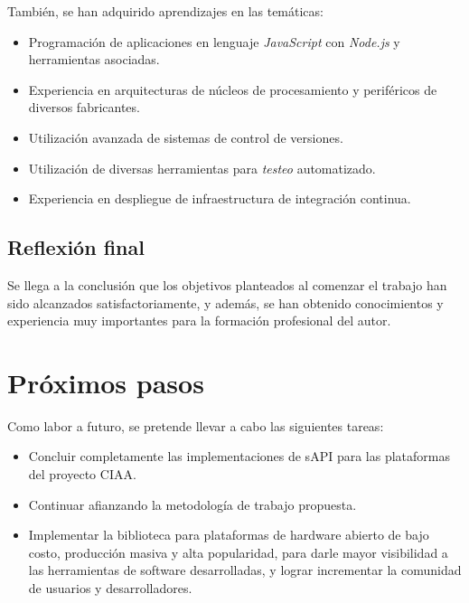
También, se han adquirido aprendizajes en las temáticas:

\begin{itemize}
\item
Programación de aplicaciones en lenguaje \emph{JavaScript} con \emph{Node.js} y herramientas asociadas.
\item
Experiencia en arquitecturas de núcleos de procesamiento y periféricos de diversos fabricantes.
\item
Utilización avanzada de sistemas de control de versiones.
\item
Utilización de diversas herramientas para \emph{testeo} automatizado. 
\item
Experiencia en despliegue de infraestructura de integración continua.
\end{itemize}

\subsection{Reflexión final}

Se llega a la conclusión que los objetivos planteados al comenzar el trabajo han sido alcanzados satisfactoriamente, y además, se han obtenido conocimientos y experiencia muy importantes para la formación profesional del autor.

\section{Próximos pasos}

Como labor a futuro, se pretende llevar a cabo las siguientes tareas:


\begin{itemize}
\item
Concluir completamente las implementaciones de sAPI para las plataformas del proyecto CIAA.
\item
Continuar afianzando la metodología de trabajo propuesta.
\item
Implementar la biblioteca para plataformas de hardware abierto de bajo costo, producción masiva y alta popularidad, para darle mayor visibilidad a las herramientas de software desarrolladas, y lograr incrementar la comunidad de usuarios y desarrolladores.
\end{itemize}

